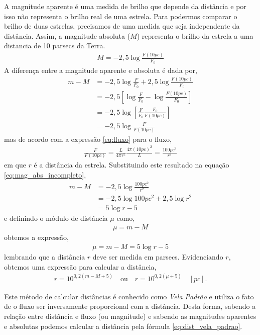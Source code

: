 A magnitude aparente é uma medida de brilho que depende da distância e por isso não representa o brilho real de uma estrela. Para podermos comparar o brilho de duas estrelas, precisamos de uma medida que seja independente da distância. Assim, a magnitude absoluta ($M$) representa o brilho da estrela a uma distancia de 10 parsecs da Terra.
\begin{align}
M = -2,5 \log \frac{F(10\si{pc})}{F_0}
\end{align}
A diferença entre a magnitude aparente e absoluta é dada por,
\begin{align}
m - M &= - 2,5 \log \frac{F}{F_0} + 2,5 \log \frac{F(10\si{pc})}{F_0} \\
&= -2,5 \left[ \log \frac{F}{F_0} - \log \frac{F(10\si{pc})}{F_0} \right] \\
&= -2,5 \log \left[ \frac{F}{F_0} \frac{F_0}{F(10\si{pc})} \right] \\
&= -2,5 \log \frac{F}{F(10\si{pc})} \label{eq:mag_abs_incompleto}
\end{align}
mas de acordo com a expressão \eqref{eq:fluxo} para o fluxo,
\begin{align}
\frac{F}{F(10\si{pc})} = \frac{L}{4\pi r^2} \frac{4\pi \left(10 \si{pc}\right)^2}{L} = \frac{100 \si{pc}^2}{r^2}
\end{align}
em que $r$ é a distância da estrela. Substituindo este resultado na equação \eqref{eq:mag_abs_incompleto},
\begin{align}
m - M &= -2,5 \log \frac{100 \si{pc}^2}{r^2} \\
&= -2,5 \log 100 \si{pc}^2 + 2,5 \log r^2 \\
&= 5 \log r - 5
\end{align}
e definindo o módulo de distância $\mu$ como,
\begin{align}
\mu = m - M
\end{align}
obtemos a expressão,
\begin{align}
\mu = m - M = 5 \log r - 5 \label{eq:modulo_distancia}
\end{align}
lembrando que a distância $r$ deve ser medida em parsecs. Evidenciando $r$, obtemos uma expressão para calcular a distância,
\begin{align}
r = 10^{0,2\left( m - M + 5 \right)} \quad \text{ou} \quad  r = 10^{0,2\left( \mu + 5 \right)} \quad \left[ \si{pc} \right]. \label{eq:dist_vela_padrao}
\end{align}

Este método de calcular distâncias é conhecido como \textit{Vela Padrão} e utiliza o fato de o fluxo ser inversamente proporcional com a distância. Desta forma, sabendo a relação entre distância e fluxo (ou magnitude) e sabendo as magnitudes aparentes e absolutas podemos calcular a distância pela fórmula \eqref{eq:dist_vela_padrao}.



